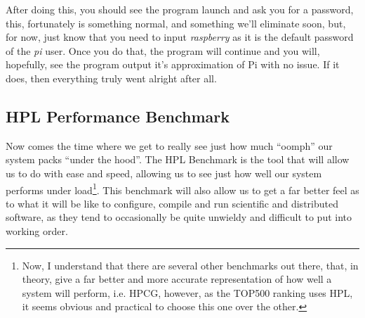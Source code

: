 \documentclass[]{article}
\begin{document}
                                                  After doing this, you should see the program launch and ask you for a password, this, fortunately is something normal, and something 
                                                  we'll eliminate soon, but, for now, just know that you need to input \textit{raspberry} as it is the default password of the 
                                                  \textit{pi} user. Once you do that, the program will continue and you will, hopefully, see the program output it's approximation of Pi
                                                  with no issue. If it does, then everything truly went alright after all.

                                                  \subsection{HPL Performance Benchmark}
                                                  Now comes the time where we get to really see just how much ``oomph'' our system packs ``under the hood''. The HPL Benchmark is the 
                                                  tool that will allow us to do with ease and speed, allowing us to see just how well our system performs under load\footnote{Now, I 
                                                      understand that there are several other benchmarks out there, that, in theory, give a far better and more accurate representation of 
                                                          how well a system will perform, i.e. HPCG, however, as the TOP500 ranking uses HPL, it seems obvious and practical to choose this one 
                                                          over the other.}. This benchmark will also allow us to get a far better feel as to what it will be like to configure, compile and run 
                                                          scientific and distributed software, as they tend to occasionally be quite unwieldy and difficult to put into working order.
\end{document}
